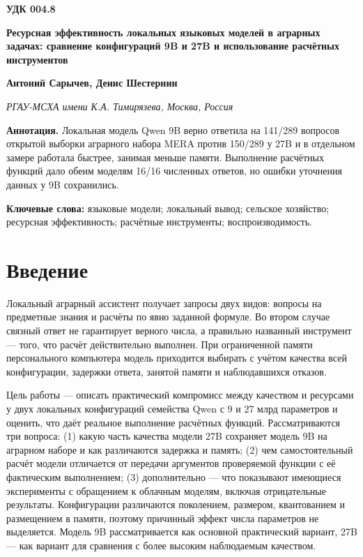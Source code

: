 \documentclass[14pt,a4paper]{extarticle}
\begin{document}
\noindent\textbf{УДК 004.8}\par\medskip
\begin{center}\bfseries\large Ресурсная эффективность локальных языковых моделей в аграрных задачах: сравнение конфигураций 9B и 27B и использование расчётных инструментов\end{center}
\begin{center}\textbf{Антоний Сарычев, Денис Шестернин}\end{center}
\begin{center}\textit{РГАУ-МСХА имени К.А. Тимирязева, Москва, Россия}\end{center}
{\noindent\fontsize{12}{14}\selectfont \textbf{Аннотация.} Локальная модель Qwen 9B верно ответила на 141/289 вопросов открытой выборки аграрного набора MERA против 150/289 у 27B и в отдельном замере работала быстрее, занимая меньше памяти. Выполнение расчётных функций дало обеим моделям 16/16 численных ответов, но ошибки уточнения данных у 9B сохранились.\par}\smallskip
{\noindent\fontsize{12}{14}\selectfont \textbf{Ключевые слова:} языковые модели; локальный вывод; сельское хозяйство; ресурсная эффективность; расчётные инструменты; воспроизводимость.\par}\smallskip
\section*{Введение}
Локальный аграрный ассистент получает запросы двух видов: вопросы на предметные знания и расчёты по явно заданной формуле. Во втором случае связный ответ не гарантирует верного числа, а правильно названный инструмент — того, что расчёт действительно выполнен. При ограниченной памяти персонального компьютера модель приходится выбирать с учётом качества всей конфигурации, задержки ответа, занятой памяти и наблюдавшихся отказов.

Цель работы — описать практический компромисс между качеством и ресурсами у двух локальных конфигураций семейства Qwen с 9 и 27 млрд параметров и оценить, что даёт реальное выполнение расчётных функций. Рассматриваются три вопроса: (1) какую часть качества модели 27B сохраняет модель 9B на аграрном наборе и как различаются задержка и память; (2) чем самостоятельный расчёт модели отличается от передачи аргументов проверяемой функции с её фактическим выполнением; (3) дополнительно — что показывают имеющиеся эксперименты с обращением к облачным моделям, включая отрицательные результаты. Конфигурации различаются поколением, размером, квантованием и размещением в памяти, поэтому причинный эффект числа параметров не выделяется. Модель 9B рассматривается как основной практический вариант, 27B — как вариант для сравнения с более высоким наблюдаемым качеством.
\end{document}

